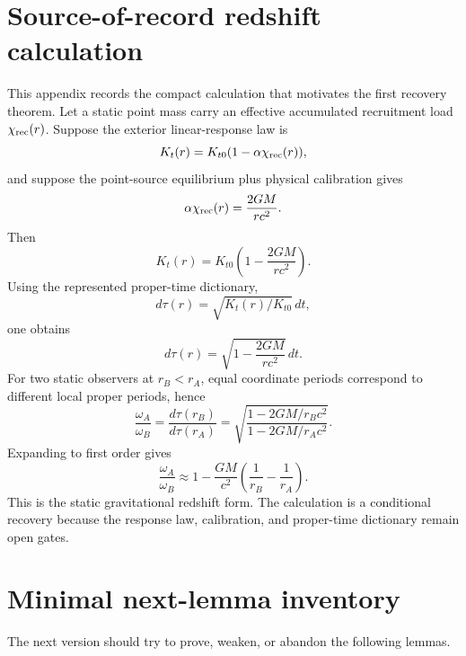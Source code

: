 \documentclass[11pt]{article}
\theoremstyle{remark}
\begin{document}
\appendix

\section{Source-of-record redshift calculation}

This appendix records the compact calculation that motivates the first recovery theorem.  Let a static point mass carry an effective accumulated recruitment load \(\chi_{\rm rec}(r)\).  Suppose the exterior linear-response law is
\[
        K_t(r)=K_{t0}(1-\alpha\chi_{\rm rec}(r)),
\]
and suppose the point-source equilibrium plus physical calibration gives
\[
        \alpha\chi_{\rm rec}(r)=\frac{2GM}{rc^2}.
\]
Then
\[
        K_t(r)=K_{t0}\left(1-\frac{2GM}{rc^2}\right).
\]
Using the represented proper-time dictionary,
\[
        d\tau(r)=\sqrt{K_t(r)/K_{t0}}\,dt,
\]
one obtains
\[
        d\tau(r)=\sqrt{1-\frac{2GM}{rc^2}}\,dt.
\]
For two static observers at \(r_B<r_A\), equal coordinate periods correspond to different local proper periods, hence
\[
        \frac{\omega_A}{\omega_B}
        =\frac{d\tau(r_B)}{d\tau(r_A)}
        =\sqrt{\frac{1-2GM/r_Bc^2}{1-2GM/r_Ac^2}}.
\]
Expanding to first order gives
\[
        \frac{\omega_A}{\omega_B}
        \approx
        1-\frac{GM}{c^2}\left(\frac1{r_B}-\frac1{r_A}\right).
\]
This is the static gravitational redshift form.  The calculation is a conditional recovery because the response law, calibration, and proper-time dictionary remain open gates.

\section{Minimal next-lemma inventory}

The next version should try to prove, weaken, or abandon the following lemmas.
\end{document}
